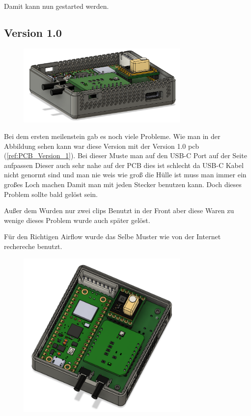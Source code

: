 \begin{inhalt}
Damit kann nun gestarted werden.

\subsection{Version 1.0}

\begin{figure}[!htb]
\centering
\includegraphics[width=0.75\textwidth]{files/Thomas/pics/geheause/1.0/gehaeuse_side.png}
\caption[Bildbezeichnung für Abbildungsverzeichnis]{}
\label{fig:gehaeuse_internet_bild}
\end{figure}

Bei dem ersten meilenstein gab es noch viele Probleme. Wie man in der Abbildung sehen kann war diese Version mit der Version 1.0 pcb (\ref{ref:PCB_Version_1}). Bei dieser Muste man auf den USB-C Port auf der Seite aufpassen Dieser auch sehr nahe auf der PCB dies ist schlecht da USB-C Kabel nicht genormt sind und man nie weis wie groß die Hülle ist muss man immer ein großes Loch machen Damit man mit jeden Stecker benutzen kann. Doch dieses Problem sollte bald gelöst sein.

Außer dem Wurden nur zwei clips Benutzt in der Front aber diese Waren zu wenige dieses Problem wurde auch später gelöst.

Für den Richtigen Airflow wurde das Selbe Muster wie von der Internet rechereche benutzt.

\begin{figure}[!htb]
\centering
\includegraphics[width=0.75\textwidth]{files/Thomas/pics/geheause/1.0/gehaeuse_top.png}
\caption[Bildbezeichnung für Abbildungsverzeichnis]{}
\label{fig:gehaeuse_internet_bild}
\end{figure}


\end{inhalt}
